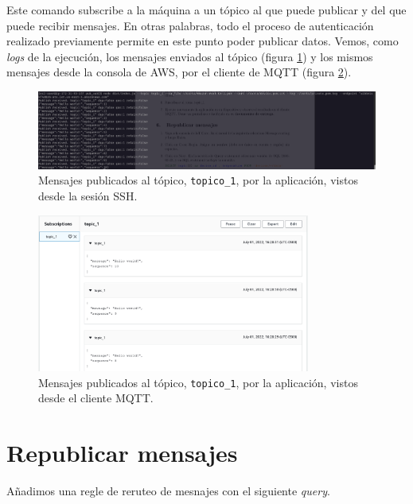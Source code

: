 \documentclass[10pt]{article}
\begin{document}
Este comando subscribe a la máquina a un tópico al que puede publicar y del que puede recibir mensajes. En otras palabras, todo el proceso de autenticación realizado previamente permite en este punto poder publicar datos. Vemos, como \textit{logs} de la ejecución, los mensajes enviados al tópico (figura \ref{fig:mensajes_de_node_al_topico_terminal}) y los mismos mensajes desde la consola de AWS, por el cliente de MQTT (figura \ref{fig:mensajes_de_node_al_topico_MQTT}).

\begin{figure}[H]
    \centering
    \includegraphics[width=1\textwidth]{Images/JSON_app_response_terminal.png}
    \caption{Mensajes publicados al tópico, \texttt{topico\_1}, por la aplicación, vistos desde la sesión SSH.}
    \label{fig:mensajes_de_node_al_topico_terminal}
\end{figure}

\begin{figure}[H]
    \centering
    \includegraphics[width=0.8\textwidth]{Images/AWS_console_topic_1_subscription.png}
    \caption{Mensajes publicados al tópico, \texttt{topico\_1}, por la aplicación, vistos desde el cliente MQTT.}
    \label{fig:mensajes_de_node_al_topico_MQTT}
\end{figure}

\section{Republicar mensajes}

Añadimos una regle de reruteo de mesnajes con el siguiente \textit{query}.
\end{document}
